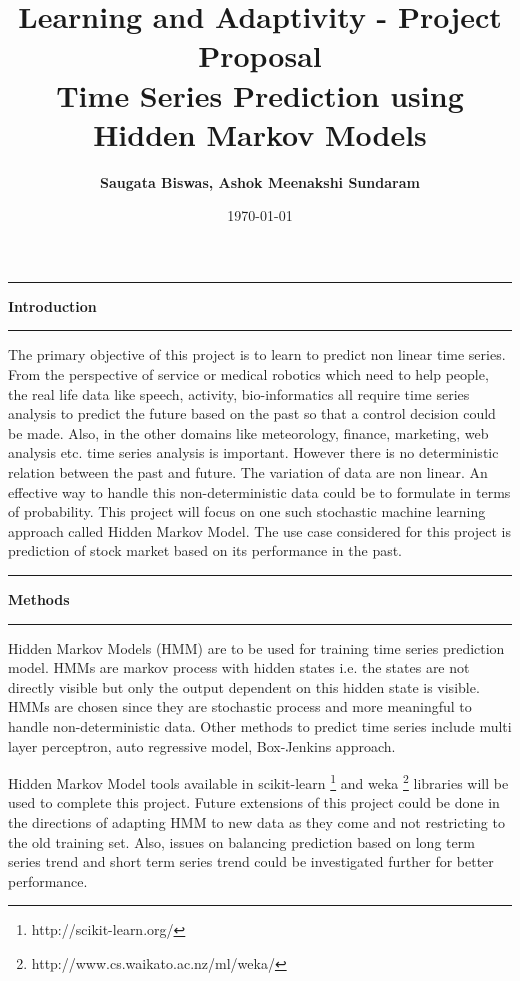 \documentclass[11pt]{article}
\title{
\textbf {\LARGE Learning and Adaptivity - Project Proposal \\ Time Series
Prediction using Hidden Markov Models} }
\author {\textbf{Saugata Biswas, Ashok Meenakshi Sundaram}} %
\date{\normalsize\today} %
\newcommand\question[1]{\vspace{.25in}\hrule\textbf{#1}\vspace{.5em}\hrule\vspace{.10in}}
\begin{document}
\maketitle




\question{Introduction}

The primary objective of this project is to learn to predict non linear time
series. From the perspective of service or medical robotics which need
to help people, the real life data like speech, activity, bio-informatics all
require time series analysis to predict the future based on the past so that a
control decision could be made. Also, in the other domains like meteorology,
finance, marketing, web analysis etc. time series analysis is important. However
there is no deterministic relation between the past and future. The variation
of data are non linear. An effective way to handle this non-deterministic data
could be to formulate in terms of probability. This project will focus on one
such stochastic machine learning approach called Hidden Markov Model. The
use case considered for this project is prediction of stock market based on its
performance in the past.

\question{Methods}

Hidden Markov Models (HMM) are to be used for training time series
prediction model. HMMs are markov process with hidden states i.e. the states are
not directly visible but only the output dependent on this hidden state is
visible. HMMs are chosen since they are stochastic process and more meaningful
to handle non-deterministic data. Other methods to predict time series include
multi layer perceptron, auto regressive model, Box-Jenkins approach.

Hidden Markov Model tools available in scikit-learn
\footnote{http://scikit-learn.org/} and weka
\footnote{http://www.cs.waikato.ac.nz/ml/weka/} libraries will be used to complete this project. Future extensions of this project could be done in the directions of adapting HMM to new data as they come and not restricting
to the old training set. Also, issues on balancing prediction based on long
term series trend and short term series trend could be investigated further for
better performance.
\end{document}

